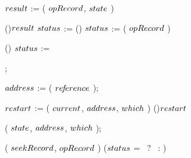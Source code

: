 \begin{limitscope}
\begin{algorithm}[tb]
{{{{{							  		
						   $result$ := \FindAdmissible( $opRecord$, $state$ )\;
							 \label{lin:local-seek:while:traversal:test|safety}
							
					     \uIf(){$result$}
						   {  
						      $status$ := \STOPNOTFOUND\;
									\label{lin:local-seek:while:traversal:safe}
						   }
						   \Else()
							 {
							    $status$ := \ExamineTop( $opRecord$ )\;
									\label{lin:local-seek:while:traversal:not|safe}
						   }
						} 
						\Else()
						{
						   $status$ := \STOPFOUND\;
							 \label{lin:local-seek:while:traversal:match}
						}
											
					  
						\Break; 
						\label{lin:local-seek:while:traversal:stop:end}
						 
			   }
			  				
				 \BlankLine
					
			   $address$ := \GetAddress( $re\!f\!erence$ ); 
				
				 
				 \If{$\opRecord \rarrow \type$ $\in$ \{ \INSERT{}, \DELETE{} \}}
				 {
				    
				    $restart$ := \Move( $current$, $address$, $which$ )\;
				    \label{lin:local-seek:while:traversal:move}
				    \If(){$restart$}
				    {
						   \Break\;
				    }
				 }
				 
				
				 
				
				 \AddToTop( $state$, $address$, $which$ ); 
			   \label{lin:local-seek:while:traversal:push}
			   \label{lin:local-seek:while:traversal:end}
	    } %
			
			
			
	    \label{lin:local-seek:while:end}	
	 }	 %
		
	 \BlankLine
		

	 \PopulateSeekRecord( $seekRecord$, $opRecord$ )\;
	 \label{lin:local-seek:populate}
	 \Return ($status$ = \STOPFOUND \  ? \  \True : \False)\;
   \label{lin:local-seek:end}
}
\end{algorithm}






\end{limitscope}

